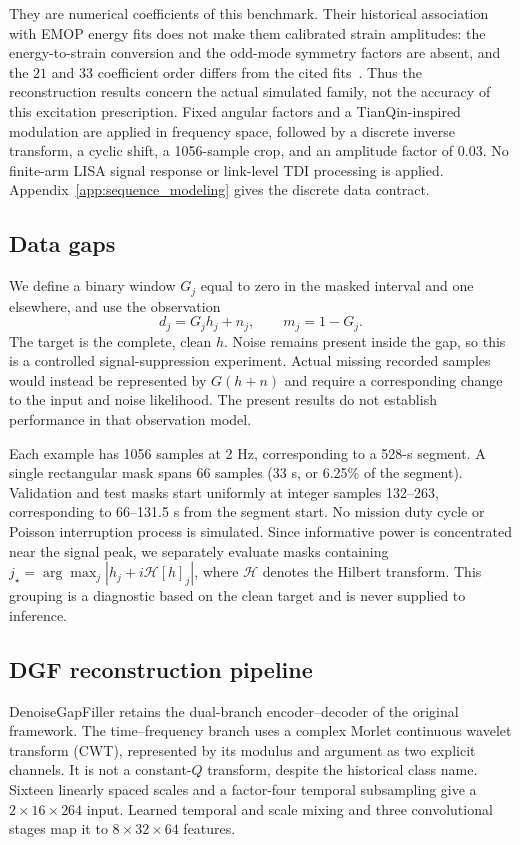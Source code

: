\documentclass[10pt,prd,aps,a4paper,twocolumn,superscriptaddress,nofootinbib,floatfix]{revtex4-2}
\begin{document}
They are numerical coefficients of this benchmark. Their historical association with EMOP energy fits does not make them calibrated strain amplitudes: the energy-to-strain conversion and the odd-mode symmetry factors are absent, and the $21$ and $33$ coefficient order differs from the cited fits~\cite{Baibhav2018energy}. Thus the reconstruction results concern the actual simulated family, not the accuracy of this excitation prescription. Fixed angular factors and a TianQin-inspired modulation are applied in frequency space, followed by a discrete inverse transform, a cyclic shift, a 1056-sample crop, and an amplitude factor of 0.03. No finite-arm LISA signal response or link-level TDI processing is applied. Appendix~\ref{app:sequence_modeling} gives the discrete data contract.

\subsection{Data gaps}\label{sec:gaps}
We define a binary window $G_j$ equal to zero in the masked interval and one elsewhere, and use the observation
\begin{equation}d_j=G_j h_j+n_j,\qquad m_j=1-G_j.\label{eq:observation}\end{equation}
The target is the complete, clean $h$. Noise remains present inside the gap, so this is a controlled signal-suppression experiment. Actual missing recorded samples would instead be represented by $G(h+n)$ and require a corresponding change to the input and noise likelihood. The present results do not establish performance in that observation model.

Each example has 1056 samples at 2 Hz, corresponding to a 528-s segment. A single rectangular mask spans 66 samples (33 s, or 6.25\% of the segment). Validation and test masks start uniformly at integer samples 132--263, corresponding to 66--131.5 s from the segment start. No mission duty cycle or Poisson interruption process is simulated. Since informative power is concentrated near the signal peak, we separately evaluate masks containing $j_\star=\arg\max_j|h_j+i\mathcal H[h]_j|$, where $\mathcal H$ denotes the Hilbert transform. This grouping is a diagnostic based on the clean target and is never supplied to inference.

\subsection{DGF reconstruction pipeline}
DenoiseGapFiller retains the dual-branch encoder--decoder of the original framework. The time--frequency branch uses a complex Morlet continuous wavelet transform (CWT), represented by its modulus and argument as two explicit channels. It is not a constant-$Q$ transform, despite the historical class name. Sixteen linearly spaced scales and a factor-four temporal subsampling give a $2\times16\times264$ input. Learned temporal and scale mixing and three convolutional stages map it to $8\times32\times64$ features.
\end{document}
